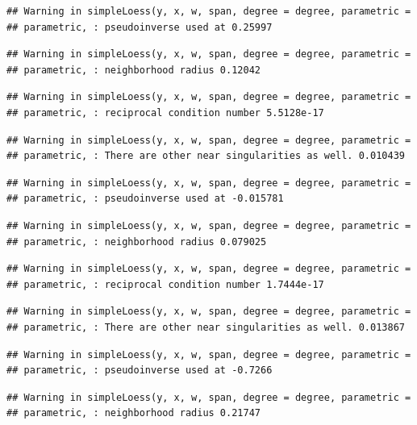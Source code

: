\documentclass[]{article}
\begin{document}
\begin{verbatim}
## Warning in simpleLoess(y, x, w, span, degree = degree, parametric =
## parametric, : pseudoinverse used at 0.25997
\end{verbatim}

\begin{verbatim}
## Warning in simpleLoess(y, x, w, span, degree = degree, parametric =
## parametric, : neighborhood radius 0.12042
\end{verbatim}

\begin{verbatim}
## Warning in simpleLoess(y, x, w, span, degree = degree, parametric =
## parametric, : reciprocal condition number 5.5128e-17
\end{verbatim}

\begin{verbatim}
## Warning in simpleLoess(y, x, w, span, degree = degree, parametric =
## parametric, : There are other near singularities as well. 0.010439
\end{verbatim}

\begin{verbatim}
## Warning in simpleLoess(y, x, w, span, degree = degree, parametric =
## parametric, : pseudoinverse used at -0.015781
\end{verbatim}

\begin{verbatim}
## Warning in simpleLoess(y, x, w, span, degree = degree, parametric =
## parametric, : neighborhood radius 0.079025
\end{verbatim}

\begin{verbatim}
## Warning in simpleLoess(y, x, w, span, degree = degree, parametric =
## parametric, : reciprocal condition number 1.7444e-17
\end{verbatim}

\begin{verbatim}
## Warning in simpleLoess(y, x, w, span, degree = degree, parametric =
## parametric, : There are other near singularities as well. 0.013867
\end{verbatim}

\begin{verbatim}
## Warning in simpleLoess(y, x, w, span, degree = degree, parametric =
## parametric, : pseudoinverse used at -0.7266
\end{verbatim}

\begin{verbatim}
## Warning in simpleLoess(y, x, w, span, degree = degree, parametric =
## parametric, : neighborhood radius 0.21747
\end{verbatim}
\end{document}
